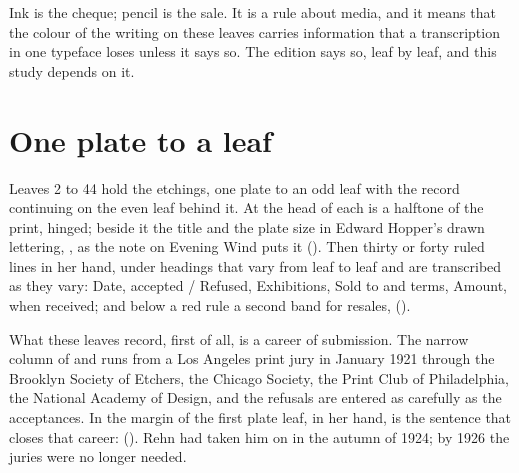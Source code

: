\noindent Ink is the cheque; pencil is the sale. It is a rule about media, and it means that the colour of the writing on these leaves carries information that a transcription in one typeface loses unless it says so. The edition says so, leaf by leaf, and this study depends on it.

\section{One plate to a leaf}

Leaves 2 to 44 hold the etchings, one plate to an odd leaf with the record continuing on the even leaf behind it. At the head of each is a halftone of the print, hinged; beside it the title and the plate size in Edward Hopper's drawn lettering, , as the note on Evening Wind puts it (). Then thirty or forty ruled lines in her hand, under headings that vary from leaf to leaf and are transcribed as they vary: Date, accepted / Refused, Exhibitions, Sold to and terms, Amount, when received; and below a red rule a second band for resales,  ().

What these leaves record, first of all, is a career of submission. The narrow column of  and  runs from a Los Angeles print jury in January 1921 through the Brooklyn Society of Etchers, the Chicago Society, the Print Club of Philadelphia, the National Academy of Design, and the refusals are entered as carefully as the acceptances. In the margin of the first plate leaf, in her hand, is the sentence that closes that career:  (). Rehn had taken him on in the autumn of 1924; by 1926 the juries were no longer needed.


